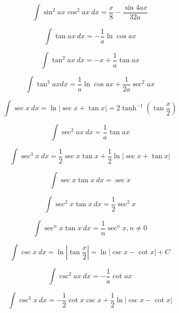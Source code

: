 \begin{equation*}
\int \sin^2 ax \cos^2 ax\ dx = \frac{x}{8}-\frac{\sin 4ax}{32a}
\end{equation*}

\begin{equation*}
\int \tan ax\ dx = -\frac{1}{a} \ln \cos ax 
\end{equation*}

\begin{equation*}
\int \tan^2 ax\ dx = -x + \frac{1}{a} \tan ax 
\end{equation*}

\begin{equation*}
\int \tan^3 ax dx = \frac{1}{a} \ln \cos ax + \frac{1}{2a}\sec^2 ax 
\end{equation*}

\begin{equation*}
\int \sec x \ dx = \ln | \sec x + \tan x | = 2 \tanh^{-1} \left (\tan \frac{x}{2} \right) 
\end{equation*}

\begin{equation*}
\int \sec^2 ax\ dx = \frac{1}{a} \tan ax 
\end{equation*}

\begin{equation*}\label{eq:Kloeppel}
\int \sec^3 x \ {dx} = \frac{1}{2} \sec x \tan x + \frac{1}{2}\ln | \sec x + \tan x |
\end{equation*}

\begin{equation*}
\int \sec x \tan x\ dx = \sec x 
\end{equation*}

\begin{equation*}
\int \sec^2 x \tan x\ dx = \frac{1}{2} \sec^2 x 
\end{equation*}

\begin{equation*}
\int \sec^n x \tan x \ dx = \frac{1}{n} \sec^n x , n\ne 0
\end{equation*}

\begin{equation*}
\int \csc x\ dx = \ln \left | \tan \frac{x}{2} \right|  = \ln | \csc x - \cot x| + C
\end{equation*}

\begin{equation*}
\int \csc^2 ax\ dx = -\frac{1}{a} \cot ax 
\end{equation*}

\begin{equation*}
\int \csc^3 x\ dx = -\frac{1}{2}\cot x \csc x + \frac{1}{2} \ln | \csc x - \cot x | 
\end{equation*}

